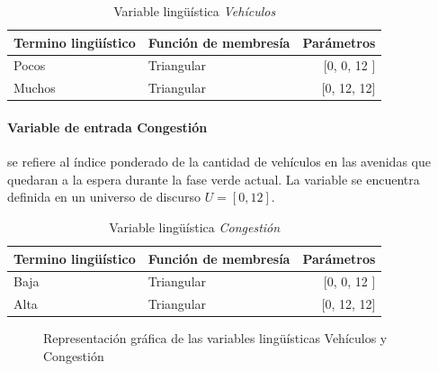 \begin{table}[!h]
	\centering
	\begin{tabular}{llr} \toprule
		Termino lingüístico & Función de membresía & Parámetros \\ \midrule
		Pocos & Triangular & [0, 0, 12 ] \\
		Muchos & Triangular & [0, 12, 12] \\ \bottomrule
	\end{tabular}
	\caption{Variable lingüística \textit{Vehículos}}
\end{table}


\paragraph{Variable de entrada Congestión} se refiere al índice ponderado de la cantidad de vehículos en las avenidas que quedaran a la espera durante la fase verde actual. La variable se encuentra definida en un universo de discurso $U = [0,12]$.

\begin{table}[!h]
	\centering
	\begin{tabular}{llr} \toprule
		Termino lingüístico & Función de membresía & Parámetros \\ \midrule
		Baja & Triangular & [0, 0, 12 ] \\
		Alta & Triangular & [0, 12, 12] \\ \bottomrule
	\end{tabular}
	\caption{Variable lingüística \textit{Congestión}}
\end{table}

\begin{figure}[H]
	\centering
	\caption[Gráficas de las variables lingüísticas vehículos y congestión]{Representación gráfica de las variables lingüísticas Vehículos y Congestión }
\end{figure}

